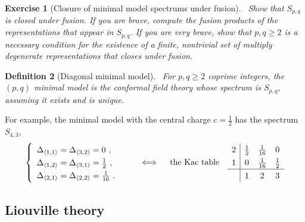 \documentclass[12pt, a4paper]{article}
\theoremstyle{break}
\newtheorem{exo}{Exercise}[section]
\newtheorem{defn}[exo]{Definition}
\begin{document}
\begin{exo}[Closure of minimal model spectrums under fusion]
 ~\label{exo:cmm}
 Show that $S_{p,q}$ is closed under fusion. If you are brave, compute the fusion products of the representations that appear in $S_{p,q}$. If you are very brave, show that $p,q\geq 2$ is a necessary condition for the existence of a finite, nontrivial set of multiply degenerate representations that closes under fusion.
\end{exo}

\begin{defn}[Diagonal minimal model]
 ~\label{def:dmm}
 For $p,q\geq 2$ coprime integers, the $(p,q)$ minimal model is the conformal field theory whose spectrum is $S_{p, q}$, assuming it exists and is unique.
\end{defn}
For example, the minimal model with the central charge $c=\frac12$ has the spectrum $S_{4,3}$, 
\begin{align}
\renewcommand{\arraystretch}{1.3}
 \left\{\begin{array}{l} \Delta_{\langle 1,1\rangle}=\Delta_{\langle 3,2\rangle} = 0 \ , \\ \Delta_{\langle 1,2\rangle} =\Delta_{\langle 3,1\rangle} = \frac12 \ , \\ \Delta_{\langle 2,1\rangle} =\Delta_{\langle 2,2\rangle} = \frac{1}{16} \ .\end{array}\right. 
 \qquad \iff \quad \text{the Kac table} \quad 
 \begin{array}{c|ccc} 2 & \frac{1}{2} & \frac{1}{16} & 0 \\ 1 & 0 & \frac{1}{16} & \frac{1}{2} \\  \hline & 1 & 2 & 3 \end{array} 
\end{align}

\subsection{Liouville theory}
\end{document}
